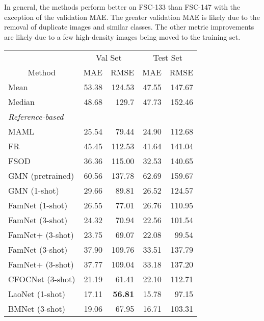 \documentclass[letterpaper, 11pt]{IEEEtran}
\begin{document}
In general, the methods perform better on FSC-133 than FSC-147 with the exception of the validation MAE. The greater validation MAE is likely due to the removal of duplicate images and similar classes. The other metric improvements are likely due to a few high-density images being moved to the training set.
\begin{table}
    \centering
    \fontsize{9}{9}\selectfont
    
\begin{tabular}{lrrrr}
 \toprule
 & \multicolumn{2}{c}{Val Set} & \multicolumn{2}{c}{Test Set} \\
\multicolumn{1}{c}{Method} & \multicolumn{1}{c}{MAE} & \multicolumn{1}{c}{RMSE} & \multicolumn{1}{c}{MAE} & \multicolumn{1}{c}{RMSE} \\

\midrule
Mean & 53.38 & 124.53 & 47.55 & 147.67 \\
Median & 48.68 & 129.7 & 47.73 & 152.46 \\
\midrule
\textit{Reference-based} & & & & \\
MAML 
\cite{finn2017model}
& 25.54 & 79.44 & 24.90 & 112.68 \\
FR 
\cite{kang2019few}
& 45.45 & 112.53 & 41.64 & 141.04 \\
FSOD 
\cite{fan2020few}
& 36.36 & 115.00 & 32.53 & 140.65 \\
GMN (pretrained) 
\cite{Lu18}
& 60.56 & 137.78 & 62.69 & 159.67 \\
GMN 
 \cite{Lu18} \hfill (1-shot) 
& 29.66 & 89.81 & 26.52 & 124.57 \\
FamNet 
 \cite{ranjan2021Famnet} \hfill (1-shot) 
& 26.55 & 77.01 & 26.76 & 110.95 \\
FamNet 
 \cite{ranjan2021Famnet} \hfill (3-shot) 
& 24.32 & 70.94 & 22.56 & 101.54 \\
FamNet+ 
 \cite{ranjan2021Famnet} \hfill (3-shot) 
& 23.75 & 69.07 & 22.08 & 99.54 \\
FamNet  \cite{ranjan2021Famnet} \hfill (3-shot) & 37.90 &  109.76 & 33.51  & 137.79  \\
FamNet+  \cite{ranjan2021Famnet} \hfill (3-shot) & 37.77 & 109.04 &  33.18 & 137.20
 \\
CFOCNet \cite{yang2021cfoc}
\hfill (3-shot) 
& 21.19 & 61.41 & 22.10 & 112.71  \\
LaoNet \cite{lin2021object}
\hfill (1-shot) 
& 17.11 & \textbf{56.81} & 15.78 & 97.15 \\
BMNet 
  \cite{shi2022represent} \hfill (3-shot) 
& 19.06 & 67.95 & 16.71 & 103.31  \\

\end{tabular}
\end{table}
\end{document}
